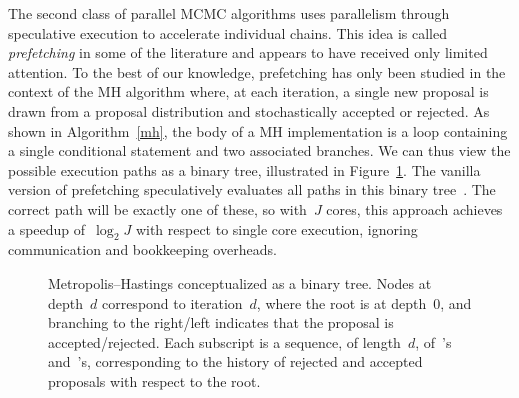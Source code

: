 \documentclass[angelino.tex]{subfiles}
\begin{document}
The second class of parallel MCMC algorithms uses parallelism through
speculative execution to accelerate individual chains.
This idea is called \emph{prefetching} in some of the literature and appears to
have received only limited attention.
To the best of our knowledge, prefetching has only been studied in the context
of the MH algorithm where, at each iteration, a single new proposal is drawn
from a proposal distribution and stochastically accepted or rejected.
As shown in Algorithm~\ref{mh}, the body of a MH implementation is a
loop containing a single conditional statement and two associated branches.
We can thus view the possible execution paths as a binary tree,
illustrated in Figure~\ref{tree}.
The vanilla version of prefetching speculatively evaluates all paths in this
binary tree~\citep{brockwell-2006-prefetching}.
The correct path will be exactly one of these, so with~$J$ cores, this approach 
achieves a speedup of~$\log_2 J$ with respect to single core execution,
ignoring communication and bookkeeping overheads.

\begin{figure}[t!]
  \centering%
  \caption{Metropolis--Hastings conceptualized as a binary tree.
  Nodes at depth~$d$ correspond to iteration~$d$, where the root is at depth~0,
  and branching to the right/left indicates that the proposal is accepted/rejected.
  Each subscript is a sequence, of length~$d$, of~'s and~'s,
  corresponding to the history of rejected and accepted proposals
  with respect to the root.  
  }
  \label{tree}
\end{figure}
\end{document}
